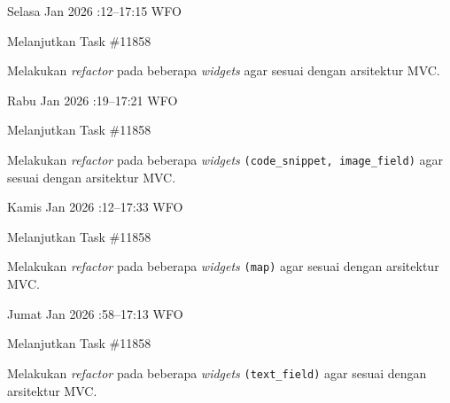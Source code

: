 \begin{logtable}
    {
        Selasa  Jan 2026 :12--17:15 \linebreak
        WFO
    }{
        \begin{loglist}
            \item Melanjutkan Task \#11858
        \end{loglist}
    }{
        \begin{logwork}
            \item Melakukan \textit{refactor} pada beberapa \textit{widgets} agar sesuai dengan
            arsitektur MVC.
        \end{logwork}
    }

    {
        Rabu  Jan 2026 :19--17:21 \linebreak
        WFO
    }{
        \begin{loglist}
            \item Melanjutkan Task \#11858
        \end{loglist}
    }{
        \begin{logwork}
            \item Melakukan \textit{refactor} pada beberapa \textit{widgets}
            \texttt{(code\_snippet, image\_field)} agar sesuai dengan arsitektur MVC.
        \end{logwork}
    }

    {
        Kamis  Jan 2026 :12--17:33 \linebreak
        WFO
    }{
        \begin{loglist}
            \item Melanjutkan Task \#11858
        \end{loglist}
    }{
        \begin{logwork}
            \item Melakukan \textit{refactor} pada beberapa \textit{widgets} \texttt{(map)} agar
            sesuai dengan arsitektur MVC.
        \end{logwork}
    }

    {
        Jumat  Jan 2026 :58--17:13 \linebreak
        WFO
    }{
        \begin{loglist}
            \item Melanjutkan Task \#11858
        \end{loglist}
    }{
        \begin{logwork}
            \item Melakukan \textit{refactor} pada beberapa \textit{widgets}
            \texttt{(text\_field)} agar sesuai dengan arsitektur MVC.
        \end{logwork}
    }


\end{logtable}
